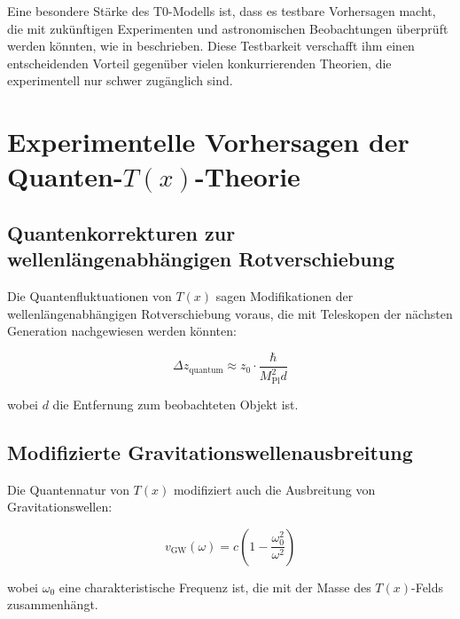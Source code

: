 \documentclass[12pt,a4paper]{article}
\newcommand{\Tfield}{T(x)}
\begin{document}
	\begin{tcolorbox}[colback=blue!5!white,colframe=blue!75!black,title=Vorteil gegenüber konkurrierenden Ansätzen]
		Eine besondere Stärke des T0-Modells ist, dass es testbare Vorhersagen macht, die mit zukünftigen Experimenten und astronomischen Beobachtungen überprüft werden könnten, wie in \cite{pascher_vereinheitlichung_2025} beschrieben. Diese Testbarkeit verschafft ihm einen entscheidenden Vorteil gegenüber vielen konkurrierenden Theorien, die experimentell nur schwer zugänglich sind.
	\end{tcolorbox}
	
	\section{Experimentelle Vorhersagen der Quanten-$\Tfield$-Theorie}
	\label{sec:experimentelle_vorhersagen}
	
	\subsection{Quantenkorrekturen zur wellenlängenabhängigen Rotverschiebung}
	\label{sec:quantenkorrekturen_rotverschiebung}
	
	Die Quantenfluktuationen von $\Tfield$ sagen Modifikationen der wellenlängenabhängigen Rotverschiebung voraus, die mit Teleskopen der nächsten Generation nachgewiesen werden könnten:
	
	\begin{equation}
		\Delta z_{\text{quantum}} \approx z_0 \cdot \frac{\hbar}{M_{\text{Pl}}^2 d}
	\end{equation}
	
	wobei $d$ die Entfernung zum beobachteten Objekt ist.
	
	\subsection{Modifizierte Gravitationswellenausbreitung}
	\label{sec:gravitationswellen}
	
	Die Quantennatur von $\Tfield$ modifiziert auch die Ausbreitung von Gravitationswellen:
	
	\begin{equation}
		v_{\text{GW}}(\omega) = c\left(1 - \frac{\omega_0^2}{\omega^2}\right)
	\end{equation}
	
	wobei $\omega_0$ eine charakteristische Frequenz ist, die mit der Masse des $\Tfield$-Felds zusammenhängt.
	
\end{document}
